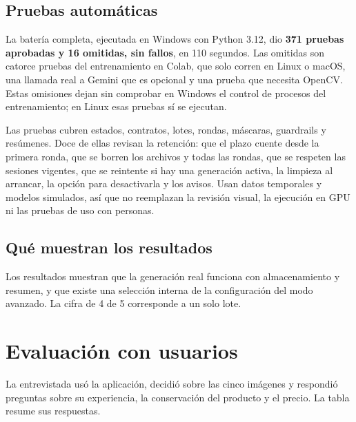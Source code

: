 \documentclass[11pt,a4paper]{article}
\begin{document}
\subsection{Pruebas automáticas}
La batería completa, ejecutada en Windows con Python 3.12, dio \textbf{371 pruebas aprobadas y 16 omitidas, sin fallos}, en 110 segundos. Las omitidas son catorce pruebas del entrenamiento en Colab, que solo corren en Linux o macOS, una llamada real a Gemini que es opcional y una prueba que necesita OpenCV. Estas omisiones dejan sin comprobar en Windows el control de procesos del entrenamiento; en Linux esas pruebas sí se ejecutan.

Las pruebas cubren estados, contratos, lotes, rondas, máscaras, guardrails y resúmenes. Doce de ellas revisan la retención: que el plazo cuente desde la primera ronda, que se borren los archivos y todas las rondas, que se respeten las sesiones vigentes, que se reintente si hay una generación activa, la limpieza al arrancar, la opción para desactivarla y los avisos. Usan datos temporales y modelos simulados, así que no reemplazan la revisión visual, la ejecución en GPU ni las pruebas de uso con personas.

\subsection{Qué muestran los resultados}
Los resultados muestran que la generación real funciona con almacenamiento y resumen, y que existe una selección interna de la configuración del modo avanzado. La cifra de 4 de 5 corresponde a un solo lote.

\clearpage
\section{Evaluación con usuarios}
La entrevistada usó la aplicación, decidió sobre las cinco imágenes y respondió preguntas sobre su experiencia, la conservación del producto y el precio. La tabla resume sus respuestas.
\end{document}
